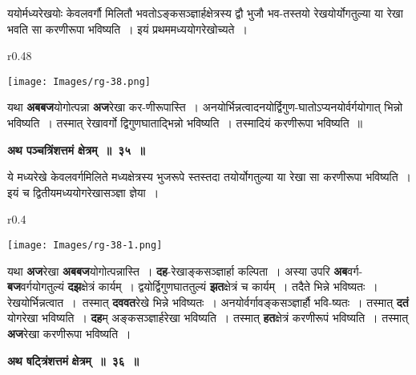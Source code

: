 \documentclass[11pt, openany]{book}
\begin{document}
 {\ab ययोर्मध्यरेखयोः केवलवर्गौ मिलितौ भवतोऽङ्कसञ्ज्ञार्हक्षेत्रस्य द्वौ भुजौ भव-तस्तयो रेखयोर्योगतुल्या या रेखा भवति सा करणीरूपा भविष्यति~। इयं प्रथममध्ययोगरेखोच्यते~।}

\newpage
 
\begin{wrapfigure}{r}{0.48\textwidth}
\vspace{-4mm}
\begin{center}
\texttt{[image: Images/rg-38.png]}
\end{center}
\vspace{-8mm}
\end{wrapfigure}

यथा \textbf{अबबज}योगोत्पन्ना \textbf{अज}रेखा कर-णीरूपास्ति~। अनयोर्भिन्नत्वादनयोर्द्विगुण-घातोऽप्यनयोर्वर्गयोगात् भिन्नो भविष्यति~। तस्मात् रेखावर्गो द्विगुणघाताद्भिन्नो  भविष्यति~। तस्मादियं करणीरूपा भविष्यति~॥
\vspace{2mm}

\begin{center}
\textbf{\large अथ पञ्चत्रिंशत्तमं क्षेत्रम्~॥~३५~॥}
\end{center}

 {\ab ये मध्यरेखे केवलवर्गमिलिते मध्यक्षेत्रस्य भुजरूपे स्तस्तदा तयोर्योगतुल्या या रेखा सा करणीरूपा भविष्यति~। इयं च द्वितीयमध्ययोगरेखासञ्ज्ञा ज्ञेया~।} \\

\begin{wrapfigure}{r}{0.4\textwidth}
\vspace{-8mm}
\begin{center}
\texttt{[image: Images/rg-38-1.png]}
\end{center}
\vspace{-8mm}
\end{wrapfigure}

 यथा \textbf{अज}रेखा \textbf{अबबज}योगोत्पन्नास्ति~। \textbf{दह}-रेखाङ्कसञ्ज्ञार्हा कल्पिता~। अस्या  उपरि \textbf{अब}वर्ग-\textbf{बज}वर्गयोगतुल्यं \textbf{दझ}क्षेत्रं कार्यम्~। द्वयोर्द्विगुणघाततुल्यं \textbf{झत}क्षेत्रं च कार्यम्~। तदैते भिन्ने भविष्यतः~। \,रेखयोर्भिन्नत्वात~। \,तस्मात् \;\textbf{दववत}रेखे भिन्ने भविष्यतः~। अनयोर्वर्गावङ्कसञ्ज्ञार्हौ भवि-ष्यतः~। तस्मात् \textbf{दतं} योगरेखा भविष्यति~। \textbf{दह}म् अङ्कसञ्ज्ञार्हरेखा भविष्यति~। तस्मात् \textbf{हत}क्षेत्रं करणीरूपं भविष्यति~। तस्मात् \textbf{अज}रेखा करणीरूपा भविष्यति~। 
\vspace{2mm}

\begin{center}
\textbf{\large अथ षट्त्रिंशत्तमं}\renewcommand{\thefootnote}{१} \textbf{\large क्षेत्रम्~॥~३६~॥}
\end{center}
\end{document}
